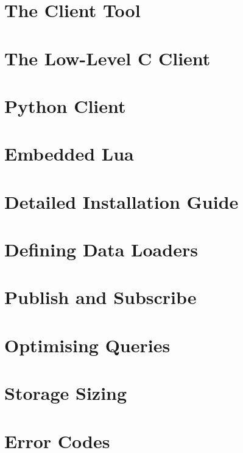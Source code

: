 \documentclass{scrreprt}
\begin{document}
\chapter{The Client Tool}\label{chpt_clienttool}

\chapter{The Low-Level C Client}\label{chpt_llc}


\chapter{Python Client}\label{chpt_pythonclient}




\chapter{Embedded Lua}\label{chpt_luaemb}


\chapter{Detailed Installation Guide}\label{chpt_install}

\chapter{Defining Data Loaders}\label{chpt_loader}

\chapter{Publish and Subscribe}\label{chpt_pubsub}

\chapter{Optimising Queries}\label{chpt_opt}


\chapter{Storage Sizing}\label{chpt_sizing}

\chapter{Error Codes}\label{chpt_errors}

\end{document}
